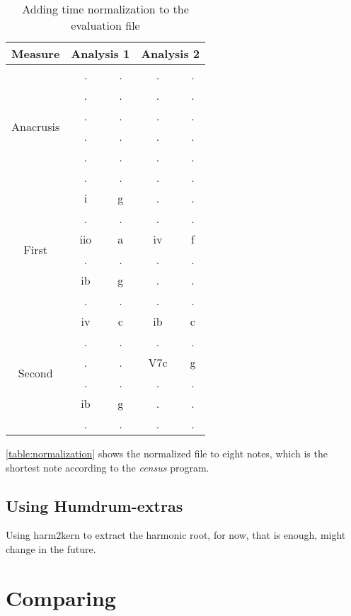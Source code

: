 	\begin{table}[tbp]
	\centering
	\begin{tabular}{|c|c|c|c|c|}
	\hline
	Measure & \multicolumn{2}{c|}{Analysis 1} & \multicolumn{2}{c|}{Analysis 2} \\ \hline
	\multirow{6}{*}{Anacrusis} & . & . & . & . \\ \cline{2-5}
	 & . & . & . & . \\ \cline{2-5}
	 & . & . & . & . \\ \cline{2-5}
	 & . & . & . & . \\ \cline{2-5}
	 & . & . & . & . \\ \cline{2-5}
	 & . & . & . & . \\ \hline
	\multirow{6}{*}{First} & i & g & . & . \\ \cline{2-5}
	 & . & . & . & . \\ \cline{2-5}
	 & iio & a & iv & f \\ \cline{2-5}
	 & . & . & . & . \\ \cline{2-5}
	 & ib & g & . & . \\ \cline{2-5}
	 & . & . & . & . \\ \hline
	\multirow{6}{*}{Second} & iv & c & ib & c \\ \cline{2-5}
	 & . & . & . & . \\ \cline{2-5}
	 & . & . & V7c & g \\ \cline{2-5}
	 & . & . & . & . \\ \cline{2-5}
	 & ib & g & . & . \\ \cline{2-5}
	 & . & . & . & . \\ \hline
	\end{tabular}
	\caption{Adding time normalization to the evaluation file}
	\label{table:normalization}
	\end{table}

	\autoref{table:normalization} shows the normalized file to eight notes, which is the shortest note according to the \emph{census} program.

	\subsection{Using Humdrum-extras}
  Using harm2kern to extract the harmonic root, for now, that is enough, might change in the future.
\section{Comparing}
